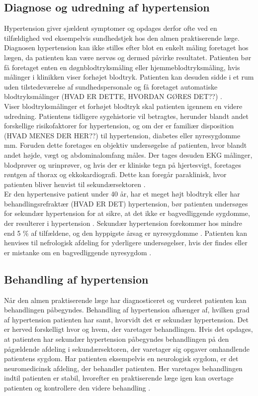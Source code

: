 \subsection{Diagnose og udredning af hypertension}
Hypertension giver sjældent symptomer og opdages derfor ofte ved en tilfældighed ved eksempelvis sundhedstjek hos den almen praktiserende læge. Diagnosen hypertension kan ikke stilles efter blot en enkelt måling foretaget hos lægen, da patienten kan være nervøs og dermed påvirke resultatet. Patienten bør få foretaget enten en døgnblodtryksmåling eller hjemmeblodtryksmåling, hvis målinger i klinikken viser forhøjet blodtryk. Patienten kan desuden sidde i et rum uden tilstedeværelse af sundhedspersonale og få foretaget automatiske blodtryksmålinger (HVAD ER DETTE, HVORDAN GØRES DET??) \citep{lodberg2016, bech2015}. \\
Viser blodtryksmålinger et forhøjet blodtryk skal patienten igennem en videre udredning. Patientens tidligere sygehistorie vil betragtes, herunder blandt andet forskellige risikofaktorer for hypertension, og om der er familiær disposition (HVAD MENES DER HER??) til hypertension, diabetes eller nyresygdomme mm. Foruden dette foretages en objektiv undersøgelse af patienten, hvor blandt andet højde, vægt og abdominalomfang måles. Der tages desuden EKG målinger, blodprøver og urinprøver, og hvis der er kliniske tegn på hjertesvigt, foretages røntgen af thorax og ekkokardiografi. Dette kan foregår paraklinisk, hvor patienten bliver henvist til sekundærsektoren \citep{lodberg2016, bech2015}. \\
Er den hypertensive patient under 40 år, har et meget højt blodtryk eller har behandlingsrefraktær (HVAD ER DET) hypertension, bør patienten undersøges for sekundær hypertension for at sikre, at det ikke er bagvedliggende sygdomme, der resulterer i hypertension \citep{lodberg2016}. Sekundær hypertension forekommer hos mindre end 5 \% af tilfældene, og den hyppigste årsag er nyresygdomme \citep{lodberg2008}. Patienten kan henvises til nefrologisk afdeling for yderligere undersøgelser, hvis der findes eller er mistanke om en bagvedliggende nyresygdom \citep{lodberg2016, sundhedsstyrelsen2010}. 

\subsection{Behandling af hypertension}
Når den almen praktiserende læge har diagnosticeret og vurderet patienten kan behandlingen påbegyndes. Behandling af hypertension afhænger af, hvilken grad af hypertension patienten har samt, hvorvidt det er sekundær hypertension. Det er herved forskelligt hvor og hvem, der varetager behandlingen. Hvis det opdages, at patienten har sekundær hypertension påbegyndes behandlingen på den pågældende afdeling i sekundærsektoren, der varetager sig opgaver omhandlende patientens sygdom. Har patienten eksempelvis en neurologisk sygdom, er det neuromedicinsk afdeling, der behandler patienten. Her varetages behandlingen indtil patienten er stabil, hvorefter en praktiserende læge igen kan overtage patienten og kontrollere den videre behandling \citep{sundhedssyrelsen2010}. 

